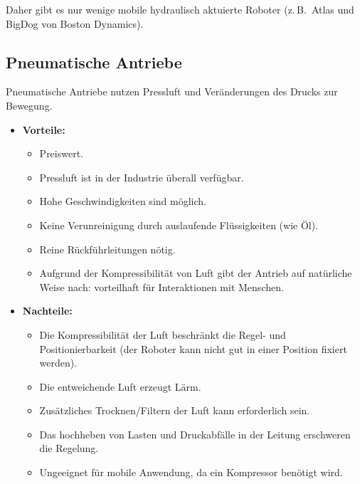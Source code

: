 \documentclass[a4paper, 11pt, accentcolor = tud3b]{tudreport}
\newcommand{\zB}{z.\,B.~}
\begin{document}
				Daher gibt es nur wenige mobile hydraulisch aktuierte Roboter (\zB Atlas und BigDog von Boston Dynamics).

			\subsection{Pneumatische Antriebe}
				Pneumatische Antriebe nutzen Pressluft und Veränderungen des Drucks zur Bewegung.
				
				\begin{itemize}
					\item \textbf{Vorteile:}
						\begin{itemize}
							\item Preiswert.
							\item Pressluft ist in der Industrie überall verfügbar.
							\item Hohe Geschwindigkeiten sind möglich.
							\item Keine Verunreinigung durch auslaufende Flüssigkeiten (wie Öl).
							\item Reine Rückführleitungen nötig.
							\item Aufgrund der Kompressibilität von Luft gibt der Antrieb auf natürliche Weise nach: vorteilhaft für Interaktionen mit Menschen.
						\end{itemize}
					\item \textbf{Nachteile:}
						\begin{itemize}
							\item Die Kompressibilität der Luft beschränkt die Regel- und Positionierbarkeit (der Roboter kann nicht gut in einer Position fixiert werden).
							\item Die entweichende Luft erzeugt Lärm.
							\item Zusätzliches Trocknen/Filtern der Luft kann erforderlich sein.
							\item Das hochheben von Lasten und Druckabfälle in der Leitung erschweren die Regelung.
							\item Ungeeignet für mobile Anwendung, da ein Kompressor benötigt wird.
						\end{itemize}
				\end{itemize}
\end{document}
